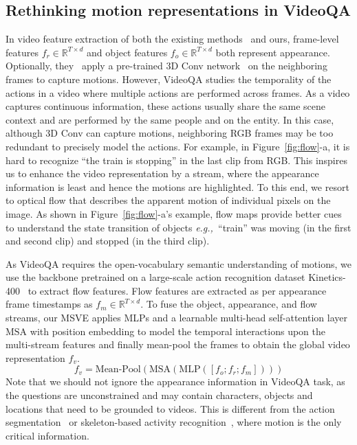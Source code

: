 \documentclass[sigconf]{acmart}
\newcommand{\eg}{\emph{e.g.,~}}
\begin{document}
\subsection{Rethinking motion representations in VideoQA}
\label{sec:flow}
In video feature extraction of both the existing methods~\cite{xiao2022vgt, xiao2022hqga, le2020hierarchical} and ours, frame-level features $f_r \in \mathbb{R}^{{T}\times d}$ and object features $f_o \in \mathbb{R}^{{T}\times d}$ both represent appearance. 
Optionally, they~\cite{xiao2022hqga,le2020hierarchical} apply a pre-trained 3D Conv network~\cite{carreira2017quo} on the neighboring frames to capture motions.
However, VideoQA studies the temporality of the actions in a video where multiple actions are performed across frames. As a video captures continuous information, these actions usually share the same scene context and are performed by the same people and on the entity. 
In this case, although 3D Conv can capture motions, neighboring RGB frames may be too redundant to precisely model the actions. For example, in Figure~\ref{fig:flow}-a, it is hard to recognize ``the train is stopping'' in the last clip from RGB. 
This inspires us to enhance the video representation by a stream, where the appearance information is least and hence the motions are highlighted. 
To this end, we resort to optical flow that describes the apparent motion of individual pixels on the image. As shown in  Figure~\ref{fig:flow}-a's example, flow maps provide better cues to understand the state transition of objects \eg ``train'' was moving (in the first and second clip) and stopped (in the third clip). 




As VideoQA requires the open-vocabulary semantic understanding of motions, we use the backbone pretrained on a large-scale action recognition dataset Kinetics-400~\cite{kay2017kinetics} to extract flow features.
Flow features are extracted as per appearance frame timestamps as $f_m \in \mathbb{R}^{T \times d}$. To fuse the object, appearance, and flow streams, our MSVE applies MLPs and a learnable multi-head self-attention layer $\text{MSA}$ with position embedding to model the temporal interactions upon the multi-stream features and finally mean-pool the frames to obtain the global video representation $f_v$.
\begin{equation}
f_v = \text{Mean-Pool}(\text{MSA}(\text{MLP}([f_o ; f_r ; f_m])))
\end{equation}
Note that we should not ignore the appearance information in VideoQA task, as the questions are unconstrained and may contain characters, objects and locations that need to be grounded to videos. This is different from the action segmentation~\cite{ding2021temporal} or skeleton-based activity recognition~\cite{zhou2021composer,duan2022revisiting}, where motion is the only critical information.
\end{document}
